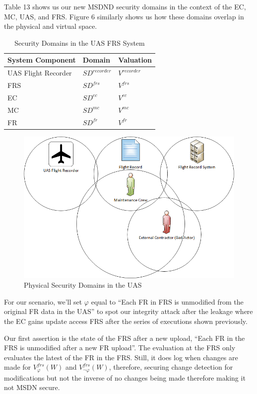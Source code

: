 \documentclass[10pt,journal,compsoc]{IEEEtran}
\begin{document}
Table 13 shows us our new MSDND security domains in the context of the EC, MC, UAS, and FRS. Figure 6 similarly shows us how these domains overlap in the physical and virtual space.  

\begin{table}[]
  \caption{Security Domains in the UAS FRS System}
  \label{tab:security-domains}
  \centering
  \begin{tabular}{lll}
  \hline
  \textbf{System Component} & \textbf{Domain} & \textbf{Valuation} \\
  \hline
  UAS Flight Recorder       & $SD^{recorder}$ & $V^{recorder}$     \\
  FRS                       & $SD^{frs}$      & $V^{frs}$          \\
  EC                        & $SD^{ec}$       & $V^{ec}$           \\
  MC                        & $SD^{mc}$       & $V^{mc}$           \\
  FR                        & $SD^{fr}$       & $V^{fr}$          
  \end{tabular}
\end{table}

\begin{figure}[t]
  \caption{Physical Security Domains in the UAS} 
  \includegraphics[scale=0.43]{SDs.png}
\end{figure}

For our scenario, we'll set $\varphi$ equal to ``Each FR in FRS is unmodified from the original FR data in the UAS'' to spot our integrity attack after the leakage where the EC gains update access FRS after the series of executions shown previously. 

Our first assertion is the state of the FRS after a new upload, ``Each FR in the FRS is unmodified after a new FR upload''. The evaluation at the FRS only evaluates the latest of the FR in the FRS. Still, it does log when changes are made for $V^{frs}_{\varphi}(W)$ and $V^{frs}_{\lnot\varphi}(W)$, therefore, securing change detection for modifications but not the inverse of no changes being made therefore making it not MSDN secure.
\end{document}
